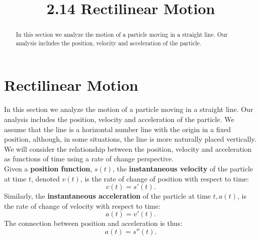 \documentclass{ximera}
\title{2.14 Rectilinear Motion}
\begin{document}
\begin{abstract}
In this section we analyze the motion of a particle moving in a straight line. Our
analysis includes the position, velocity and acceleration of the particle.
\end{abstract}

\maketitle


\section{Rectilinear Motion}

In this section we analyze the motion of a particle moving in a straight line. Our
analysis includes the position, velocity and acceleration of the particle.
We assume that the line is a horizontal number line with the origin in a fixed position, although, in some situations, 
the line is more naturally placed vertically. We will consider the relationship between the position, 
velocity and acceleration as functions of time using a rate of change perspective. \\
Given a \textbf{position function}, $s(t)$, the \textbf{instantaneous velocity} of the particle at time $t$, 
denoted $v(t)$, is the rate of change of position 
with respect to time:
\[v(t) = s'(t).\]
Similarly, the \textbf{instantaneous acceleration} of the particle at time $t, a(t)$, is the rate of change of 
velocity with respect to time:
\[a(t) = v'(t).\]
The connection between position and acceleration is thus:
\[a(t) = s''(t).\]
\end{document}
